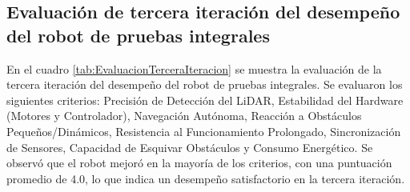 \subsection{Evaluaci\'on de tercera iteraci\'on del desempe\~no del robot de pruebas integrales}
En el cuadro \ref{tab:EvaluacionTerceraIteracion} se muestra la evaluaci\'on de la tercera iteraci\'on del desempe\~no del robot de pruebas integrales. Se evaluaron los siguientes criterios: Precisi\'on de Detecci\'on del LiDAR, Estabilidad del Hardware (Motores y Controlador), Navegaci\'on Aut\'onoma, Reacci\'on a Obst\'aculos Peque\~nos/Din\'amicos, Resistencia al Funcionamiento Prolongado, Sincronizaci\'on de Sensores, Capacidad de Esquivar Obst\'aculos y Consumo Energ\'etico. Se observ\'o que el robot mejor\'o en la mayor\'ia de los criterios, con una puntuaci\'on promedio de 4.0, lo que indica un desempe\~no satisfactorio en la tercera iteraci\'on.
